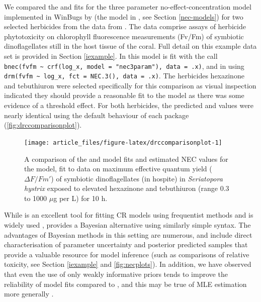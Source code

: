 \documentclass[
  shortnames]{jss}
\begin{document}
We compared the  and  fits for the three parameter no-effect-concentration model implemented in WinBugs by \citet{Fox2010} (the  model in , see Section \ref{nec-models}) for two selected herbicides from the data from \citet{jones2003meps}. The data comprise assays of herbicide phytotoxicity on chlorophyll fluorescence measurements (Fv/Fm) of symbiotic dinoflagellates still in the host tissue of the coral. Full detail on this example data set is provided in Section \ref{iexample}. In  this model is fit with the call \texttt{bnec(fvfm\ \textasciitilde{}\ crf(log\_x,\ model\ =\ "nec3param"),\ data\ =\ .x)}, and in  using \texttt{drm(fvfm\ \textasciitilde{}\ log\_x,\ fct\ =\ NEC.3(),\ data\ =\ .x)}. The herbicides hexazinone and tebuthiuron were selected specifically for this comparison as visual inspection indicated they should provide a reasonable fit to the \citet{Fox2010} model as there was some evidence of a threshold effect. For both herbicides, the predicted  and  values were nearly identical using the default behaviour of each package (\autoref{fig:drccomparisonplot}).

\begin{CodeChunk}
\begin{figure}[!ht]

{\centering \texttt{[image: article\_files/figure-latex/drccomparisonplot-1]} 

}

\caption[A comparison of the  and  model fits and estimated NEC values for the  model, fit to data on maximum effective quantum yield ($\Delta F / Fm'$) of symbiotic dinoflagellates (in hospite) in \textit{Seriatopora hystrix} exposed to elevated hexazinone and tebuthiuron (range 0.3 to 1000 $\mu$g per L) for 10 h]{A comparison of the  and  model fits and estimated NEC values for the  model, fit to data on maximum effective quantum yield ($\Delta F / Fm'$) of symbiotic dinoflagellates (in hospite) in \textit{Seriatopora hystrix} exposed to elevated hexazinone and tebuthiuron (range 0.3 to 1000 $\mu$g per L) for 10 h.}\label{fig:drccomparisonplot}
\end{figure}
\end{CodeChunk}

While  is an excellent tool for fitting CR models using frequentist methods and is widely used \citep[ is cited nearly 2,000 times]{Ritz2016},  provides a Bayesian alternative using similarly simple syntax. The advantages of Bayesian methods in this setting are numerous, and include direct characterisation of parameter uncertainty and posterior predicted samples that provide a valuable resource for model inference (such as comparisons of relative toxicity, see Section \ref{iexample} and \autoref{fig:necplots}). In addition, we have observed that even the use of only weakly informative priors tends to improve the reliability of model fits compared to , and this may be true of MLE estimation more generally \citep{krull2020comparing}.
\end{document}
